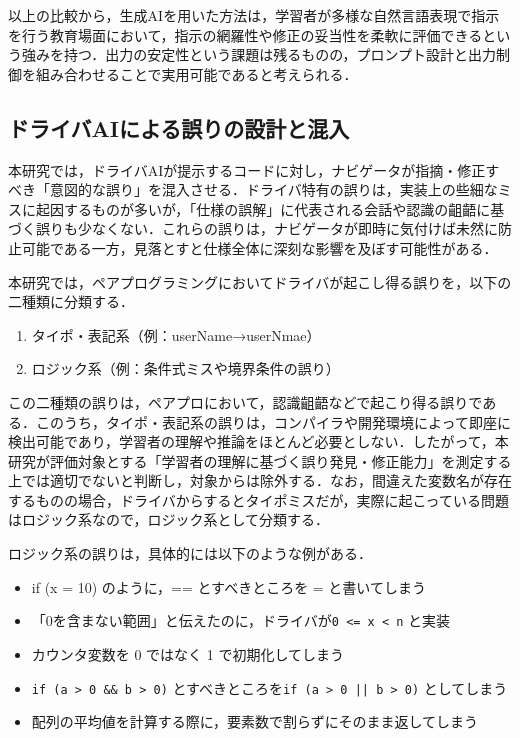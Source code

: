 \documentclass[twoside,twocolumn,10pt]{jsarticle}
\begin{document}
以上の比較から，生成AIを用いた方法は，学習者が多様な自然言語表現で指示を行う教育場面において，指示の網羅性や修正の妥当性を柔軟に評価できるという強みを持つ．出力の安定性という課題は残るものの，プロンプト設計と出力制御を組み合わせることで実用可能であると考えられる．

\subsection{ドライバAIによる誤りの設計と混入}
本研究では，ドライバAIが提示するコードに対し，ナビゲータが指摘・修正すべき「意図的な誤り」を混入させる．ドライバ特有の誤りは，実装上の些細なミスに起因するものが多いが，「仕様の誤解」に代表される会話や認識の齟齬に基づく誤りも少なくない．これらの誤りは，ナビゲータが即時に気付けば未然に防止可能である一方，見落とすと仕様全体に深刻な影響を及ぼす可能性がある．

本研究では，ペアプログラミングにおいてドライバが起こし得る誤りを，以下の二種類に分類する．

\begin{enumerate}
    \item タイポ・表記系（例：userName→userNmae）
    \item ロジック系（例：条件式ミスや境界条件の誤り）
\end{enumerate}

この二種類の誤りは，ペアプロにおいて，認識齟齬などで起こり得る誤りである．このうち，タイポ・表記系の誤りは，コンパイラや開発環境によって即座に検出可能であり，学習者の理解や推論をほとんど必要としない．したがって，本研究が評価対象とする「学習者の理解に基づく誤り発見・修正能力」を測定する上では適切でないと判断し，対象からは除外する．なお，間違えた変数名が存在するものの場合，ドライバからするとタイポミスだが，実際に起こっている問題はロジック系なので，ロジック系として分類する．

ロジック系の誤りは，具体的には以下のような例がある．

\begin{itemize}
        \item if (x = 10) のように，== とすべきところを = と書いてしまう
        \item 「0を含まない範囲」と伝えたのに，ドライバが\texttt{0 <= x < n} と実装
        \item カウンタ変数を 0 ではなく 1 で初期化してしまう
        \item \texttt{if (a > 0 \&\& b > 0)} とすべきところを\texttt{if (a > 0 || b > 0)} としてしまう
        \item 配列の平均値を計算する際に，要素数で割らずにそのまま返してしまう
\end{itemize}
\end{document}
